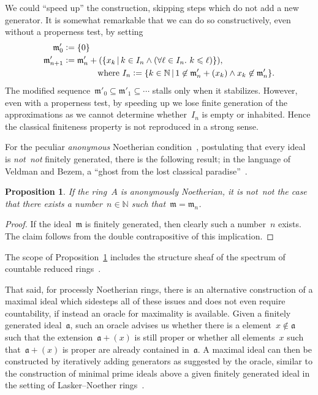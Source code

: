 \documentclass[com,11pt,crcready]{iosart2x}
\theoremstyle{definition}
\theoremstyle{plain}
\newtheorem{proposition}[definition]{Proposition}
\theoremstyle{remark}
\newcommand{\?}{\,{:}\,}
\newcommand{\aaa}{\mathfrak{a}}
\newcommand{\mmm}{\mathfrak{m}}
\newcommand{\NN}{\mathbb{N}}
\newcommand{\defeq}{\vcentcolon=}
\renewcommand{\_}{\mathpunct{.}\,}
\begin{document}
We could ``speed up'' the construction, skipping steps which do not add a new
generator. It is somewhat remarkable that we can do so constructively, even
without a properness test, by setting
\begin{align*}
  \mmm'_0 &\defeq \{ 0 \} \\
  \mmm'_{n+1} &\defeq \mmm'_n + (\{ x_k \,|\,
    k \in I_n \wedge (\forall \ell \in I_n\_ k \leq \ell) \}), \\
  &\qquad\qquad\text{where $I_n \defeq \{ k \in \NN \,|\, 1 \not\in \mmm'_n +
  (x_k) \wedge x_k \not\in \mmm'_n \}$.}
\end{align*}
The modified sequence~$\mmm'_0 \subseteq \mmm'_1 \subseteq \cdots$ stalls only
when it stabilizes. However, even with a properness test, by speeding up we lose
finite generation of the approximations as we cannot determine whether~$I_n$ is
empty or inhabited. Hence the classical
finiteness property is not reproduced in a strong sense.

For the peculiar \emph{anonymous} Noetherian condition~\cite[Definition~3.27]{blechschmidt:phd}, postulating that every
ideal is \emph{not~not} finitely generated, there is the following result;
in the language of Veldman and Bezem, a ``ghost from the lost classical
paradise''~\cite[Section~5.1]{veldman-bezem:ramsey}.

\begin{proposition}\label{prop:fin-anon}If the ring~$A$ is anonymously
Noetherian, it is \emph{not~not} the case that there exists a number~$n \in
\NN$ such that~$\mmm = \mmm_n$.\end{proposition}

\begin{proof}If the ideal~$\mmm$ is finitely generated, then clearly such a
number~$n$ exists. The claim follows from the double contrapositive of this
implication.
\end{proof}

The scope of Proposition~\ref{prop:fin-anon} includes the structure sheaf of
the spectrum of countable reduced
rings~\cite[Proposition~34]{blechschmidt:generalized-spaces}.

That said, for processly Noetherian rings, there is an alternative
construction of a maximal ideal which sidesteps all of these issues and does
not even require countability, if instead an oracle for maximality is available.
Given a finitely generated ideal~$\aaa$, such an oracle advises us whether there is a
element~$x \not\in \aaa$ such that the extension~$\aaa + (x)$ is still proper
or whether all elements~$x$ such that~$\aaa + (x)$ is proper are already
contained in~$\aaa$. A maximal ideal can then be constructed by iteratively
adding generators as suggested by the oracle, similar to the construction of
minimal prime ideals above a given finitely generated ideal in the setting of
Lasker--Noether rings~\cite[Theorem~E]{perdry:noetherian}.
\end{document}

